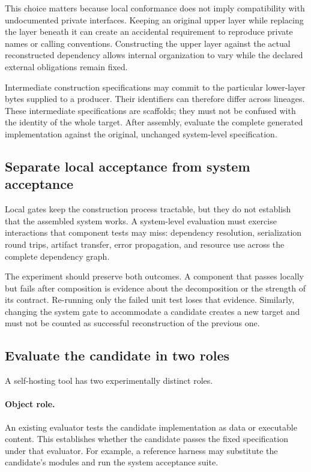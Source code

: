 \documentclass[10pt,twocolumn,letterpaper]{article}
\begin{document}
This choice matters because local conformance does not imply compatibility with undocumented private interfaces. Keeping an original upper layer while replacing the layer beneath it can create an accidental requirement to reproduce private names or calling conventions. Constructing the upper layer against the actual reconstructed dependency allows internal organization to vary while the declared external obligations remain fixed.

Intermediate construction specifications may commit to the particular lower-layer bytes supplied to a producer. Their identifiers can therefore differ across lineages. These intermediate specifications are scaffolds; they must not be confused with the identity of the whole target. After assembly, evaluate the complete generated implementation against the original, unchanged system-level specification.

\subsection{Separate local acceptance from system acceptance}
Local gates keep the construction process tractable, but they do not establish that the assembled system works. A system-level evaluation must exercise interactions that component tests may miss: dependency resolution, serialization round trips, artifact transfer, error propagation, and resource use across the complete dependency graph.

The experiment should preserve both outcomes. A component that passes locally but fails after composition is evidence about the decomposition or the strength of its contract. Re-running only the failed unit test loses that evidence. Similarly, changing the system gate to accommodate a candidate creates a new target and must not be counted as successful reconstruction of the previous one.

\subsection{Evaluate the candidate in two roles}
A self-hosting tool has two experimentally distinct roles.

\paragraph{Object role.} An existing evaluator tests the candidate implementation as data or executable content. This establishes whether the candidate passes the fixed specification under that evaluator. For example, a reference harness may substitute the candidate's modules and run the system acceptance suite.
\end{document}
